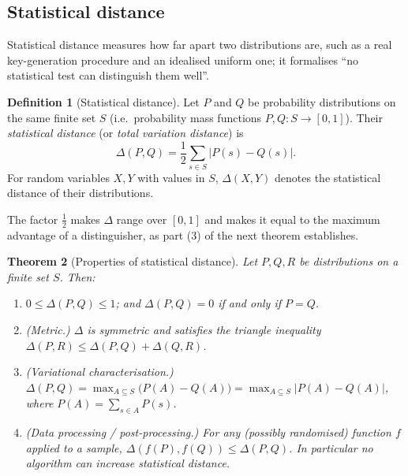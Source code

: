 \documentclass[11pt,a4paper]{article}
\newtheorem{theorem}{Theorem}[section]
\theoremstyle{definition}
\newtheorem{definition}[theorem]{Definition}
\theoremstyle{remark}
\begin{document}
\subsection{Statistical distance}

Statistical distance measures how far apart two distributions are, such
as a real key-generation procedure and an idealised uniform one; it
formalises ``no statistical test can distinguish them well''.

\begin{definition}[Statistical distance]\label{probability:def-sd}
Let \(P\) and \(Q\) be probability distributions on the same finite
set \(S\) (i.e.\ probability mass functions
\(P, Q\colon S \to [0,1]\)). Their \emph{statistical distance} (or
\emph{total variation distance}) is
\[
\Delta(P, Q) = \frac12 \sum_{s \in S} \bigl|P(s) - Q(s)\bigr| .
\]
For random variables \(X, Y\) with values in \(S\), \(\Delta(X, Y)\)
denotes the statistical distance of their distributions.
\end{definition}

The factor \(\tfrac12\) makes \(\Delta\) range over \([0,1]\) and
makes it equal to the maximum advantage of a distinguisher, as part (3)
of the next theorem establishes.

\begin{theorem}[Properties of statistical distance]
\label{probability:thm-sd}
Let \(P, Q, R\) be distributions on a finite set \(S\). Then:
\begin{enumerate}
\item \(0 \le \Delta(P,Q) \le 1\); and \(\Delta(P,Q) = 0\) if and
  only if \(P = Q\).
\item \emph{(Metric.)} \(\Delta\) is symmetric and satisfies the
  triangle inequality
  \(\Delta(P,R) \le \Delta(P,Q) + \Delta(Q,R)\).
\item \emph{(Variational characterisation.)}
  \(\displaystyle \Delta(P,Q)
  = \max_{A \subseteq S}\bigl(P(A) - Q(A)\bigr)
  = \max_{A \subseteq S}\bigl|P(A) - Q(A)\bigr|\), where
  \(P(A) = \sum_{s \in A} P(s)\).
\item \emph{(Data processing / post-processing.)} For any (possibly
  randomised) function \(f\) applied to a sample,
  \(\Delta(f(P), f(Q)) \le \Delta(P, Q)\). In particular no algorithm
  can increase statistical distance.
\end{enumerate}
\end{theorem}
\end{document}
